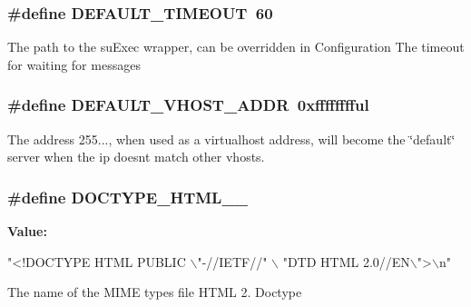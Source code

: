 \subsubsection[{\texorpdfstring{D\+E\+F\+A\+U\+L\+T\+\_\+\+T\+I\+M\+E\+O\+UT}{DEFAULT_TIMEOUT}}]{\setlength{\rightskip}{0pt plus 5cm}\#define D\+E\+F\+A\+U\+L\+T\+\_\+\+T\+I\+M\+E\+O\+UT~60}\hypertarget{group__APACHE__CORE__DAEMON_gaad2dd72565852b91c809cd4685833b17}{}\label{group__APACHE__CORE__DAEMON_gaad2dd72565852b91c809cd4685833b17}
The path to the su\+Exec wrapper, can be overridden in Configuration The timeout for waiting for messages 
\subsubsection[{\texorpdfstring{D\+E\+F\+A\+U\+L\+T\+\_\+\+V\+H\+O\+S\+T\+\_\+\+A\+D\+DR}{DEFAULT_VHOST_ADDR}}]{\setlength{\rightskip}{0pt plus 5cm}\#define D\+E\+F\+A\+U\+L\+T\+\_\+\+V\+H\+O\+S\+T\+\_\+\+A\+D\+DR~0xfffffffful}\hypertarget{group__APACHE__CORE__DAEMON_ga4a85b545afcdbd61558b560155cf164b}{}\label{group__APACHE__CORE__DAEMON_ga4a85b545afcdbd61558b560155cf164b}
The address 255..., when used as a virtualhost address, will become the \char`\"{}default\char`\"{} server when the ip doesn\textquotesingle{}t match other vhosts. 
\subsubsection[{\texorpdfstring{D\+O\+C\+T\+Y\+P\+E\+\_\+\+H\+T\+M\+L\+\_\+2\+\_\+0}{DOCTYPE_HTML_2_0}}]{\setlength{\rightskip}{0pt plus 5cm}\#define D\+O\+C\+T\+Y\+P\+E\+\_\+\+H\+T\+M\+L\+\_\+\_}\hypertarget{group__APACHE__CORE__DAEMON_ga70618842d5ed94e721b9513714d994e7}{}\label{group__APACHE__CORE__DAEMON_ga70618842d5ed94e721b9513714d994e7}
{\bfseries Value\+:}
\begin{DoxyCode}
\textcolor{stringliteral}{"<!DOCTYPE HTML PUBLIC \(\backslash\)"-//IETF//"} \(\backslash\)
                          \textcolor{stringliteral}{"DTD HTML 2.0//EN\(\backslash\)">\(\backslash\)n"}
\end{DoxyCode}
The name of the M\+I\+ME types file H\+T\+ML 2. Doctype 
